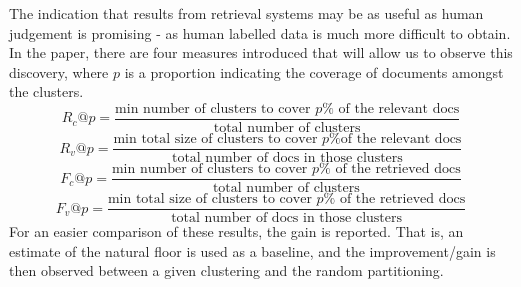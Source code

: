 \documentclass[sigconf,authorversion,nonacm]{acmart}
\begin{document}
The indication that results from retrieval systems may be as useful as human judgement is promising - as human labelled
data is much more difficult to obtain. In the paper, there are four measures introduced that will allow us to observe
this discovery, where $p$ is a proportion indicating the coverage of documents amongst the clusters. \begin{displaymath}
    R_c@p = \frac{\text{min number of clusters to cover }p\%\text{ of the relevant docs}}{\text{total number of
    clusters}} \end{displaymath} \begin{displaymath} R_v@p = \frac{\text{min total size of clusters to cover }p\%\text{
    of the relevant docs}}{\text{total number of docs in those clusters}} \end{displaymath} \begin{displaymath} F_c@p =
    \frac{\text{min number of clusters to cover }p\%\text{ of the retrieved docs}}{\text{total number of clusters}}
    \end{displaymath} \begin{displaymath} F_v@p = \frac{\text{min total size of clusters to cover }p\%\text{ of the
retrieved docs}}{\text{total number of docs in those clusters}} \end{displaymath} For an easier comparison of these
results, the gain is reported. That is, an estimate of the natural floor is used as a baseline, and the improvement/gain
is then observed between a given clustering and the random partitioning. 
\end{document}
